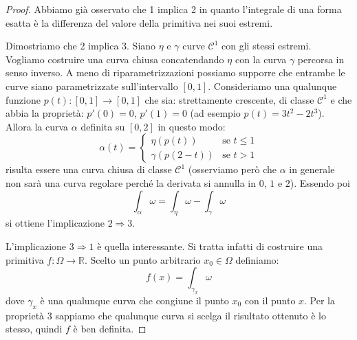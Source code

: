 \documentclass[italian,a4paper]{scrartcl}
\newcommand{\RR}{{\mathbb R}}
\begin{document}
\begin{proof}
Abbiamo già osservato che 1 implica 2 in quanto l'integrale di
una forma esatta è la differenza del valore della primitiva nei suoi estremi.

Dimostriamo che 2 implica 3. Siano $\eta$ e $\gamma$ curve
$\mathcal C^1$ con gli stessi estremi. Vogliamo costruire una curva
chiusa concatendando $\eta$ con la curva $\gamma$ percorsa in senso
inverso. A meno di riparametrizzazioni possiamo supporre che entrambe
le curve siano parametrizzate sull'intervallo $[0,1]$. Consideriamo
una qualunque funzione $p(t)\colon [0,1]\to [0,1]$ che sia:
strettamente crescente, di classe $\mathcal C^1$ e che abbia la
proprietà: $p'(0)=0$, $p'(1)=0$ (ad esempio $p(t)=3t^2-2t^3$). Allora
la curva $\alpha$ definita su $[0,2]$ in questo modo:
\[
\alpha(t) =
\begin{cases}
  \eta(p(t)) & \text{se $t\le 1$} \\
  \gamma(p(2-t)) & \text{se $t> 1$}
\end{cases}
\]
risulta essere una curva chiusa di classe $\mathcal C^1$ (osserviamo
però che $\alpha$ in generale non sarà una curva regolare perché la
derivata si annulla in $0$, $1$ e $2$). Essendo poi
\[
\int_\alpha \omega = \int_\eta \omega - \int_\gamma \omega
\]
si ottiene l'implicazione $2 \Rightarrow 3$.

L'implicazione $3 \Rightarrow 1$ è quella interessante. Si
tratta infatti di costruire una primitiva $f\colon \Omega\to \RR$.
Scelto un punto arbitrario $x_0\in \Omega$ definiamo:
\[
f(x) = \int_{\gamma_x} \omega
\]
dove $\gamma_x$ è una qualunque curva che congiune il punto $x_0$ con
il punto $x$. Per la proprietà 3 sappiamo che qualunque curva si
scelga il risultato ottenuto è lo stesso, quindi $f$ è ben definita.


\end{proof}
\end{document}
